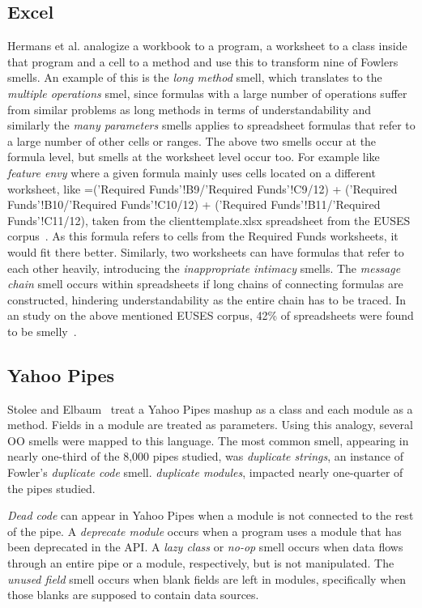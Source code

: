 \documentclass{sig-alternate}
\begin{document}
 \subsection{Excel}
Hermans et al. \cite{Hermans2012inter,Hermans2012intra} analogize a workbook to a program, a worksheet to a class inside that program and a cell to a method and use this to transform nine of Fowlers smells.
An example of this is the \emph{long method} smell, which translates to the \emph{multiple operations} smel, since formulas with a large number of operations suffer from similar problems as long methods in terms of understandability and similarly the \emph{many parameters} smells applies to spreadsheet formulas that refer to a large number of other cells or ranges. The above two smells occur at the formula level, but smells at the worksheet level occur too. For example like \emph{feature envy} where a given formula mainly uses cells located on a different worksheet, like =('Required Funds'!B9/'Required Funds'!C9/12) + ('Required Funds'!B10/'Required Funds'!C10/12) + ('Required Funds'!B11/'Required Funds'!C11/12), taken from the clienttemplate.xlsx spreadsheet from the EUSES corpus~\cite{fisher2005euses}. As this formula refers to cells from the Required Funds worksheets, it would fit there better. Similarly, two worksheets can have formulas that refer to each other heavily, introducing the \emph{inappropriate intimacy} smells. The \emph{message chain} smell occurs within spreadsheets if long chains of connecting formulas are constructed, hindering understandability as the entire chain has to be traced. In an study on the above mentioned EUSES corpus, 42\% of spreadsheets were found to be smelly~\cite{Hermans2012intra}.

\subsection{Yahoo Pipes}
Stolee and Elbaum~\cite{Stolee2011, StoleeTSE2013} treat a Yahoo Pipes mashup as a class and each module as a method.  Fields in a module are treated as parameters. Using this analogy,  several OO smells were mapped to this language. The most common smell, appearing in nearly one-third of the 8,000 pipes studied, was \emph{duplicate strings}, an instance of Fowler's \emph{duplicate code} smell. 
\emph{duplicate modules}, impacted nearly one-quarter of the pipes studied. 
 
\emph{Dead code} can appear in Yahoo Pipes when a module is not connected to the rest of the pipe. A  \emph{deprecate module} occurs when a program uses a module that has been deprecated in the API. A \emph{lazy class} or \emph{no-op} smell occurs when data flows through an entire pipe or a module, respectively, but is not manipulated. The \emph{unused field} smell occurs when blank fields are left in modules, specifically when those blanks are supposed to contain data sources. 
\end{document}
